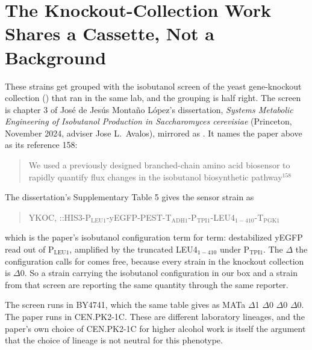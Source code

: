 
\section{The Knockout-Collection Work Shares a Cassette, Not a Background}
\label{sec:yko}

These strains get grouped with the isobutanol screen of the yeast gene-knockout
collection () that ran in the same lab, and the grouping is half
right. The screen is chapter 3 of Jos\'e de Jes\'us Monta\~no L\'opez's
dissertation, \textit{Systems Metabolic Engineering of Isobutanol Production in
Saccharomyces cerevisiae} (Princeton, November 2024, adviser Jose L.\ Avalos),
mirrored as . It names the paper
above as its reference 158:

\begin{quote}\small
We used a previously designed branched-chain amino acid biosensor to rapidly
quantify flux changes in the isobutanol biosynthetic pathway$^{158}$
\end{quote}

 The dissertation's
Supplementary Table 5 gives the sensor strain as

\begin{quote}\small
YKOC, ::HIS3-P$_{\text{LEU1}}$-yEGFP-PEST-T$_{\text{ADH1}}$-P$_{\text{TPI1}}$-LEU4$_{1-410}$-T$_{\text{PGK1}}$
\end{quote}

\noindent
which is the paper's isobutanol configuration term for term: destabilized yEGFP
read out of P$_{\text{LEU1}}$, amplified by the truncated LEU4$_{1-410}$ under
P$_{\text{TPI1}}$. The $\Delta$ the configuration calls for comes free,
because every strain in the knockout collection is $\Delta$0. So a
strain carrying the isobutanol configuration in our box and a strain from that
screen are reporting the same quantity through the same reporter.

 The screen runs in BY4741, which the
same table gives as  MATa $\Delta$1 $\Delta$0
$\Delta$0 $\Delta$0. The paper runs in CEN.PK2-1C. These
are different laboratory lineages, and the paper's own choice of CEN.PK2-1C for
higher alcohol work is itself the argument that the choice of lineage is not
neutral for this phenotype.

